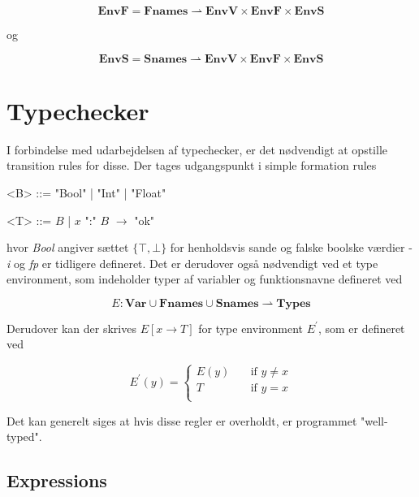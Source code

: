 $$ \textbf{EnvF} = \textbf{Fnames} \rightharpoonup \textbf{EnvV} \times \textbf{EnvF} \times \textbf{EnvS} $$

\noindent og

$$ \textbf{EnvS} = \textbf{Snames} \rightharpoonup \textbf{EnvV} \times \textbf{EnvF} \times \textbf{EnvS} $$

\tocless \section{Typechecker}
\noindent I forbindelse med udarbejdelsen af typechecker, er det nødvendigt at opstille transition rules for disse. Der tages udgangspunkt i simple formation rules

\begin{grammar}
    \centering
    <B> ::= "Bool" | "Int" | "Float"
    
    <T> ::= $B$ | $x$ ":" $B$ $\rightarrow$ "ok"
\end{grammar}

\noindent hvor \textit{Bool} angiver sættet $\{\top, \bot\}$ for henholdsvis sande og falske boolske værdier - \textit{i} og \textit{fp} er tidligere defineret. Det er derudover også nødvendigt ved et type environment, som indeholder typer af variabler og funktionsnavne defineret ved 

$$ E : \textbf{Var} \cup \textbf{Fnames} \cup \textbf{Snames} \rightharpoonup \textbf{Types} $$

\noindent Derudover kan der skrives $E[x \rightarrow T]$ for type environment $E^\prime$, som er defineret ved 

\[ E^\prime(y) =
  \begin{cases}
    E(y)       & \quad \text{if } y \ne x\\
    T          & \quad \text{if } y = x\\
  \end{cases}
\]

\noindent Det kan generelt siges at hvis disse regler er overholdt, er programmet "well-typed"\mbox{}.

\tocless \subsection{Expressions}


